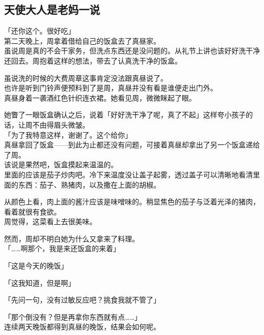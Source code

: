 \subsection{天使大人是老妈一说}

「还你这个。很好吃」\\

第二天晚上，周拿着借给自己的饭盒去了真昼家。\\

虽说周是真的不会干家务，但洗点东西还是没问题的。从礼节上讲也该好好洗干净还回去。周抱着这样的想法，带去了认真洗干净的饭盒。

虽说洗的时候的大费周章这事肯定没法跟真昼说了。\\

也许是听到门铃声便预料到了是周，真昼并没有看是谁便走出门外。\\

真昼身着一袭酒红色针织连衣裙。她看见周，微微眯起了眼。

她瞥了一眼饭盒确认之后，说着「好好洗干净了呢，真了不起」这样夸小孩子的话，让周不由得眉头微皱。\\

「为了我特意这样，谢谢了。这个给你」\\

真昼拿回了饭盒——到此为止都还没有问题，可接着真昼却拿出了另一个饭盒递给了周。\\

该说是果然吧，饭盒摸起来温温的。\\

里面的应该是茄子炒肉吧。冷下来温度没让盖子起雾，透过盖子可以清晰地看清里面的东西：茄子、熟猪肉，以及撒在上面的胡椒。

从颜色上看，肉上面的酱汁应该是味噌味的。稍显焦色的茄子与泛着光泽的猪肉，看着就很有食欲。\\

周觉得，这菜看上去很美味。

然而，周却不明白她为什么又拿来了料理。\\

「……啊那个，我是来还饭盒的来着」

「这是今天的晚饭」

「这我知道，但是啊」

「先问一句，没有过敏反应吧？挑食我就不管了」

「那个倒没有？但是再拿你东西就有点……」\\

连续两天晚饭都得到真昼的晚饭，结果会如何呢。\\

